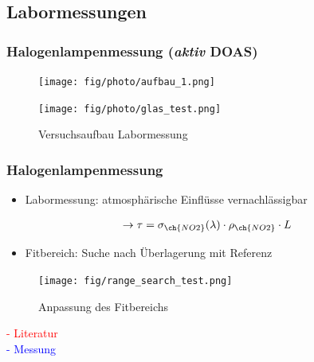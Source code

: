 \documentclass{beamer}
\begin{document}
\begin{frame}
    \section{Labormessungen}
    \frametitle{Halogenlampenmessung (\textit{aktiv} DOAS)}

    \begin{figure}[h]
        \texttt{[image: fig/photo/aufbau\_1.png]}
    \end{figure}
	\vspace{-0.2cm}
    \begin{figure}[h]
        \texttt{[image: fig/photo/glas\_test.png]}
        \caption{Versuchsaufbau Labormessung}
    \end{figure}
\end{frame}

\begin{frame} 
    \frametitle{Halogenlampenmessung}
    \vspace{-2cm}
	\begin{itemize}
    	\item Labormessung: atmosphärische Einflüsse vernachlässigbar
	\end{itemize}
	\begin{align}
	 	\to \tau = \sigma_{\ch{NO2}}(\lambda) \cdot \rho_{\ch{NO2}} \cdot L
	\end{align}
	
    \begin{itemize}
    	\item Fitbereich: Suche nach Überlagerung mit  Referenz
	\end{itemize}

	\begin{figure}[h]
		\texttt{[image: fig/range\_search\_test.png]}
        \caption{Anpassung des Fitbereichs}
	\end{figure}
    \vspace{-4.5cm}
    \hspace{8.5cm}
    \begin{minipage}[t]{\linewidth}
        \textcolor{red}{- Literatur}\\
        \textcolor{blue}{- Messung}
\end{minipage}
\end{frame} 
\end{document}
